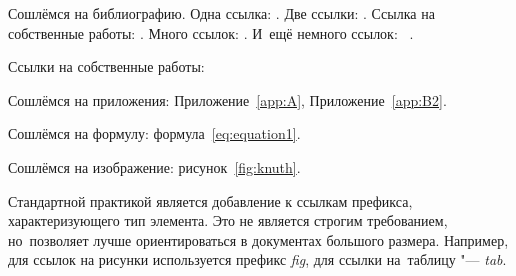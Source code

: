 Сошлёмся на библиографию.
Одна ссылка: \cite[с.~54]{Sokolov}\cite[с.~36]{Gaidaenko}.
Две ссылки: \cite{Sokolov,Gaidaenko}.
Ссылка на собственные работы: \cite{vakbib1, confbib2}.
Много ссылок: %
\cite{Lermontov, Management, Borozda, Marketing, Constitution, FamilyCode,
Gost.7.0.53, Razumovski, Lagkueva, Pokrovski, Methodology, Nasirova, Berestova,
Kriger}%
%
.
И~ещё немного ссылок:~\cite{Article,Book,Booklet,Conference,Inbook,Incollection,Manual,Mastersthesis,
Misc,Phdthesis,Proceedings,Techreport,Unpublished}
\cite{medvedev2006jelektronnye, CEAT:CEAT581, doi:10.1080/01932691.2010.513279,
Gosele1999161,Li2007StressAnalysis, Shoji199895, test:eisner-sample,
test:eisner-sample-shorted, AB_patent_Pomerantz_1968, iofis_patent1960}
%
.

%

Ссылки на собственные работы:~\cite{vakbib1, confbib1}

Сошлёмся на приложения: Приложение~\ref{app:A}, Приложение~\ref{app:B2}.

Сошлёмся на формулу: формула~\eqref{eq:equation1}.

Сошлёмся на изображение: рисунок~\ref{fig:knuth}.

Стандартной практикой является добавление к ссылкам префикса, характеризующего тип элемента.
Это не является строгим требованием, но~позволяет лучше ориентироваться в документах большого размера.
Например, для ссылок на рисунки используется префикс \textit{fig},
для ссылки на~таблицу "--- \textit{tab}.

